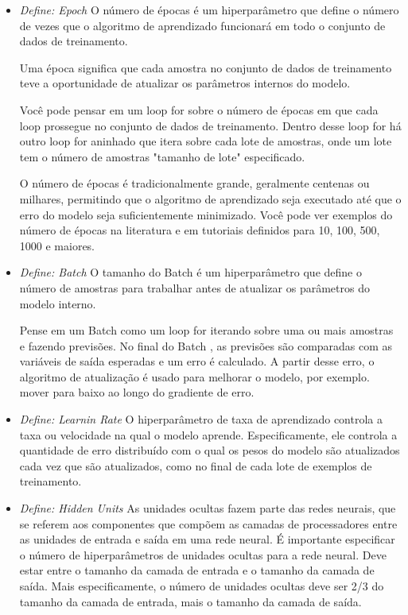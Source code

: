 \begin{itemize}
   \item  \textit{Define: Epoch} O número de épocas é um hiperparâmetro que define o número de vezes que o algoritmo de aprendizado funcionará em todo o conjunto de dados de treinamento.

         Uma época significa que cada amostra no conjunto de dados de treinamento teve a oportunidade de atualizar os parâmetros internos do modelo.

         Você pode pensar em um loop for sobre o número de épocas em que cada loop prossegue no conjunto de dados de treinamento. Dentro desse loop for há outro loop for aninhado que itera sobre cada lote de amostras, onde um lote tem o número de amostras "tamanho de lote" especificado.

         O número de épocas é tradicionalmente grande, geralmente centenas ou milhares, permitindo que o algoritmo de aprendizado seja executado até que o erro do modelo seja suficientemente minimizado. Você pode ver exemplos do número de épocas na literatura e em tutoriais definidos para 10, 100, 500, 1000 e maiores.

   \item \textit{Define: Batch} O tamanho do Batch é um hiperparâmetro que define o número de amostras para trabalhar antes de atualizar os parâmetros do modelo interno.

         Pense em um Batch como um loop for iterando sobre uma ou mais amostras e fazendo previsões. No final do Batch , as previsões são comparadas com as variáveis de saída esperadas e um erro é calculado. A partir desse erro, o algoritmo de atualização é usado para melhorar o modelo, por exemplo. mover para baixo ao longo do gradiente de erro.

   \item \textit{Define: Learnin Rate} O hiperparâmetro de taxa de aprendizado controla a taxa ou velocidade na qual o modelo aprende. Especificamente, ele controla a quantidade de erro distribuído com o qual os pesos do modelo são atualizados cada vez que são atualizados, como no final de cada lote de exemplos de treinamento.

   \item \textit{Define: Hidden Units} As unidades ocultas fazem parte das redes neurais, que se referem aos componentes que compõem as camadas de processadores entre as unidades de entrada e saída em uma rede neural. É importante especificar o número de hiperparâmetros de unidades ocultas para a rede neural. Deve estar entre o tamanho da camada de entrada e o tamanho da camada de saída. Mais especificamente, o número de unidades ocultas deve ser 2/3 do tamanho da camada de entrada, mais o tamanho da camada de saída.

\end{itemize}


